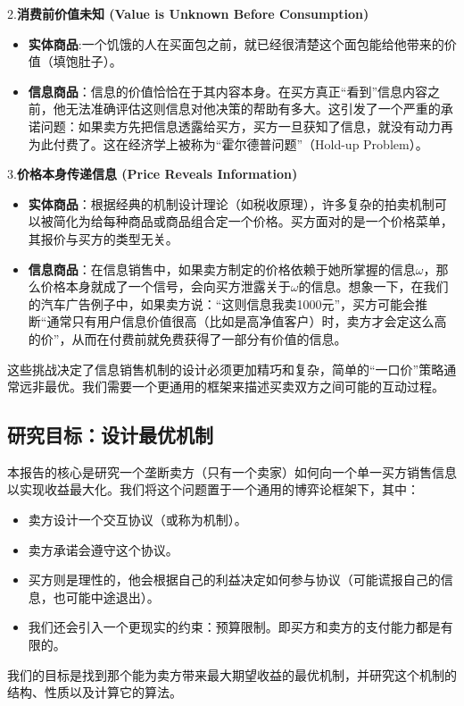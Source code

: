 2.\textbf{消费前价值未知 (Value is Unknown Before Consumption)}
\begin{itemize}
   \item \textbf{实体商品}:一个饥饿的人在买面包之前，就已经很清楚这个面包能给他带来的价值（填饱肚子）。
   \item \textbf{信息商品}：信息的价值恰恰在于其内容本身。在买方真正“看到”信息内容之前，他无法准确评估这则信息对他决策的帮助有多大。这引发了一个严重的承诺问题：如果卖方先把信息透露给买方，买方一旦获知了信息，就没有动力再为此付费了。这在经济学上被称为“霍尔德普问题”（Hold-up Problem）。
\end{itemize}

3.\textbf{价格本身传递信息 (Price Reveals Information)}
\begin{itemize}
   \item \textbf{实体商品}：根据经典的机制设计理论（如税收原理），许多复杂的拍卖机制可以被简化为给每种商品或商品组合定一个价格。买方面对的是一个价格菜单，其报价与买方的类型无关。
   \item \textbf{信息商品}：在信息销售中，如果卖方制定的价格依赖于她所掌握的信息$\omega$，那么价格本身就成了一个信号，会向买方泄露关于$\omega$的信息。想象一下，在我们的汽车广告例子中，如果卖方说：“这则信息我卖1000元”，买方可能会推断“通常只有用户信息价值很高（比如是高净值客户）时，卖方才会定这么高的价”，从而在付费前就免费获得了一部分有价值的信息。
\end{itemize}

这些挑战决定了信息销售机制的设计必须更加精巧和复杂，简单的“一口价”策略通常远非最优。我们需要一个更通用的框架来描述买卖双方之间可能的互动过程。

\subsection{研究目标：设计最优机制}

本报告的核心是研究一个垄断卖方（只有一个卖家）如何向一个单一买方销售信息以实现收益最大化。我们将这个问题置于一个通用的博弈论框架下，其中：
\begin{itemize}
   \item 卖方设计一个交互协议（或称为机制）。
   \item 卖方承诺会遵守这个协议。
   \item 买方则是理性的，他会根据自己的利益决定如何参与协议（可能谎报自己的信息，也可能中途退出）。
   \item 我们还会引入一个更现实的约束：预算限制。即买方和卖方的支付能力都是有限的。
\end{itemize}

我们的目标是找到那个能为卖方带来最大期望收益的最优机制，并研究这个机制的结构、性质以及计算它的算法。